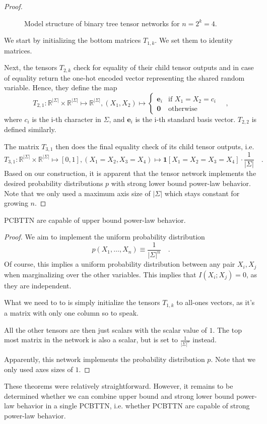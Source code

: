 \documentclass[../../main.tex]{subfiles}
\begin{document}
\begin{proof}
\begin{figure}[h]
\begin{tikzpicture}
            \end{tikzpicture}
            \caption{Model structure of binary tree tensor networks for $n = 2^k = 4$.}
            \label{fig:binary_tree_tensor_network_n_equals_four_2}
        \end{figure}
        
        We start by initializing the bottom matrices $T_{1,k}$. We set them to identity matrices.

        Next, the tensors $T_{2,k}$ check for equality of their child tensor outputs and in case of equality return the one-hot encoded vector representing the shared random variable. Hence, they define the map
        \[
            T_{2,1}: \mathbb{R}^{|\Sigma|} \times \mathbb{R}^{|\Sigma|} \mapsto \mathbb{R}^{|\Sigma|}, (X_1, X_2) \mapsto
            \begin{cases}
                \bm{e}_i & \text{if } X_1 = X_2 = c_i \\
                \bm{0} & \text{otherwise}
            \end{cases}
            \quad ,
        \]
        where $c_i$ is the i-th character in $\Sigma$, and $\bm{e}_i$ is the i-th standard basis vector. $T_{2,2}$ is defined similarly.

        The matrix $T_{3,1}$ then does the final equality check of its child tensor outputs, i.e.
        \[
            T_{3,1}: \mathbb{R}^{|\Sigma|} \times \mathbb{R}^{|\Sigma|} \mapsto [0, 1], (X_1 = X_2, X_3 = X_4) \mapsto \bm{1}[X_1 = X_2 = X_3 = X_4] \cdot \frac{1}{|\Sigma|} \quad .
        \]
        Based on our construction, it is apparent that the tensor network implements the desired probability distributions $p$ with strong lower bound power-law behavior. Note that we only used a maximum axis size of $|\Sigma|$ which stays constant for growing $n$.
    \end{proof}

    \begin{theorem}
        PCBTTN are capable of upper bound power-law behavior.
    \end{theorem}
    \begin{proof}
        We aim to implement the uniform probability distribution
        \[
            p(X_1, \dots, X_n) \equiv \frac{1}{|\Sigma|^n} \quad .
        \]
        Of course, this implies a uniform probability distribution between any pair $X_i, X_j$ when marginalizing over the other variables. This implies that $I(X_i;X_j) = 0$, as they are independent.

        What we need to to is simply initialize the tensors $T_{1,k}$ to all-ones vectors, as it's a matrix with only one column so to speak.

        All the other tensors are then just scalars with the scalar value of $1$. The top most matrix in the network is also a scalar, but is set to $\frac{1}{|\Sigma|^n}$ instead.

        Apparently, this network implements the probability distribution $p$. Note that we only used axes sizes of $1$.
    \end{proof}

    These theorems were relatively straightforward. However, it remains to be determined whether we can combine upper bound and strong lower bound power-law behavior in a single PCBTTN, i.e. whether PCBTTN are capable of strong power-law behavior.
\end{document}
